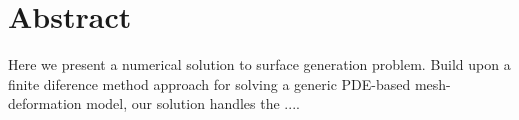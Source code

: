 \section*{Abstract}

Here we present a numerical solution to surface generation problem. Build upon a finite diference method approach for solving a generic PDE-based mesh-deformation model, our solution handles the ....

\pagebreak
